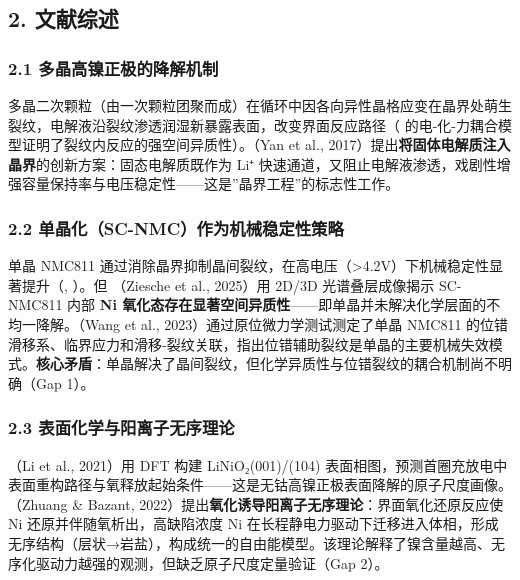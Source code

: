 \documentclass[12pt,a4paper]{ctexart}
\begin{document}
\subsection{2. 文献综述}\label{ux6587ux732eux7efcux8ff0}

\subsubsection{2.1 多晶高镍正极的降解机制}\label{ux591aux6676ux9ad8ux954dux6b63ux6781ux7684ux964dux89e3ux673aux5236}

多晶二次颗粒（由一次颗粒团聚而成）在循环中因各向异性晶格应变在晶界处萌生裂纹，电解液沿裂纹渗透润湿新暴露表面，改变界面反应路径（\cite{p31} 的电-化-力耦合模型证明了裂纹内反应的强空间异质性）。\cite{p06}（Yan et al., 2017）提出\textbf{将固体电解质注入晶界}的创新方案：固态电解质既作为 Li⁺ 快速通道，又阻止电解液渗透，戏剧性增强容量保持率与电压稳定性------这是''晶界工程''的标志性工作。

\subsubsection{2.2 单晶化（SC-NMC）作为机械稳定性策略}\label{ux5355ux6676ux5316sc-nmcux4f5cux4e3aux673aux68b0ux7a33ux5b9aux6027ux7b56ux7565}

单晶 NMC811 通过消除晶界抑制晶间裂纹，在高电压（\textgreater4.2V）下机械稳定性显著提升（\cite{p24}, \cite{p25}）。但 \cite{p24}（Ziesche et al., 2025）用 2D/3D 光谱叠层成像揭示 SC-NMC811 内部 \textbf{Ni 氧化态存在显著空间异质性}------即单晶并未解决化学层面的不均一降解。\cite{p25}（Wang et al., 2023）通过原位微力学测试测定了单晶 NMC811 的位错滑移系、临界应力和滑移-裂纹关联，指出位错辅助裂纹是单晶的主要机械失效模式。\textbf{核心矛盾}：单晶解决了晶间裂纹，但化学异质性与位错裂纹的耦合机制尚不明确（Gap 1）。

\subsubsection{2.3 表面化学与阳离子无序理论}\label{ux8868ux9762ux5316ux5b66ux4e0eux9633ux79bbux5b50ux65e0ux5e8fux7406ux8bba}

\cite{p32}（Li et al., 2021）用 DFT 构建 LiNiO₂(001)/(104) 表面相图，预测首圈充放电中表面重构路径与氧释放起始条件------这是无钴高镍正极表面降解的原子尺度画像。\cite{p27}（Zhuang \& Bazant, 2022）提出\textbf{氧化诱导阳离子无序理论}：界面氧化还原反应使 Ni 还原并伴随氧析出，高缺陷浓度 Ni 在长程静电力驱动下迁移进入体相，形成无序结构（层状→岩盐），构成统一的自由能模型。该理论解释了镍含量越高、无序化驱动力越强的观测，但缺乏原子尺度定量验证（Gap 2）。
\end{document}
